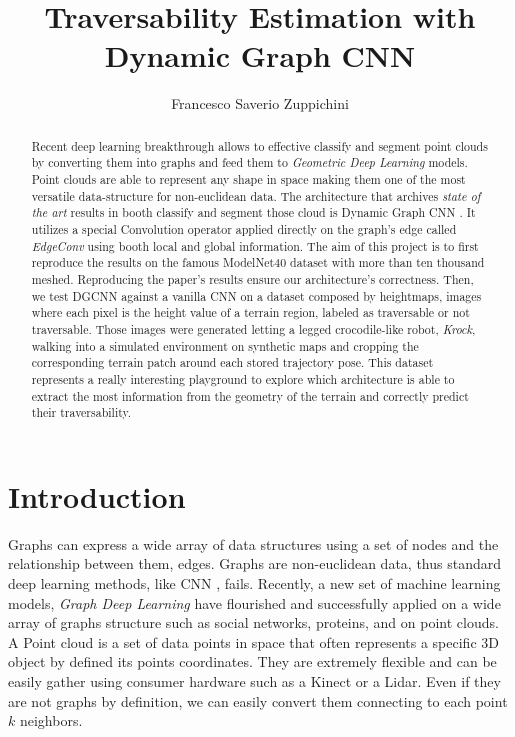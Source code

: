 \documentclass[twocolumn,showpacs,
  nofootinbib,aps,superscriptaddress,
  eqsecnum,prd,notitlepage,showkeys,10pt]{revtex4-1}
\begin{document}
\title{Traversability Estimation with Dynamic Graph CNN}
\author{Francesco Saverio Zuppichini}
\begin{abstract}
  Recent deep learning breakthrough allows to effective classify and segment point clouds by converting them into graphs and feed them to \emph{Geometric Deep Learning} models. Point clouds are able to represent any shape in space making them one of the most versatile data-structure for non-euclidean data. The architecture that archives \emph{state of the art} results in booth classify and segment those cloud is Dynamic Graph CNN \cite{dgcnn}. It utilizes a special Convolution operator applied directly on the graph's edge called \emph{EdgeConv} using booth local and global information. The aim of this project is to first reproduce the results on the famous ModelNet40 \cite{shapenet} dataset with more than ten thousand meshed. Reproducing the paper's results ensure our architecture's correctness.
  Then, we test DGCNN against a vanilla CNN on a dataset composed by heightmaps, images where each pixel is the height value of a terrain region, labeled as traversable or not traversable. Those images were generated letting a legged crocodile-like robot, \emph{Krock}, walking into a simulated environment on synthetic maps and cropping the corresponding terrain patch around each stored trajectory pose. This dataset represents a really interesting playground to explore which architecture is able to extract the most information from the geometry of the terrain and correctly predict their traversability. 
\end{abstract}
\maketitle
\section{Introduction}

Graphs can express a wide array of data structures using a set of nodes and the relationship between them, edges. Graphs are non-euclidean data, thus standard deep learning methods, like CNN \cite{cnn}, fails. Recently, a new set of machine learning models, \emph{Graph Deep Learning} have flourished and successfully applied on a wide array of graphs structure such as social networks, proteins, and on point clouds. A Point cloud is a set of data points in space that often represents a specific 3D object by defined its points coordinates. They are extremely flexible and can be easily gather using consumer hardware such as a Kinect or a Lidar. Even if they are not graphs by definition, we can easily convert them connecting to each point $k$ neighbors.
\end{document}
